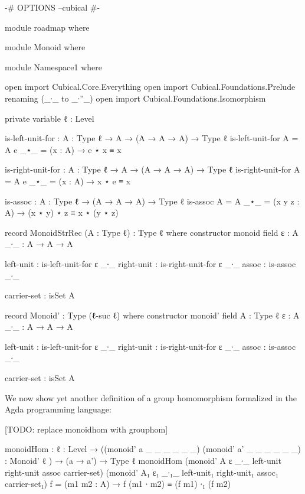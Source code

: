 \documentclass[11pt, a4paper]{article}
\begin{document}
\begin{code}[hide]
{-# OPTIONS --cubical #-}

module roadmap where

\end{code}

\begin{code}[hide]

module Monoid where

module Namespace1 where

  open import Cubical.Core.Everything
  open import Cubical.Foundations.Prelude renaming (_∙_ to _∙''_)
  open import Cubical.Foundations.Isomorphism

  private
    variable
      ℓ : Level

  is-left-unit-for : {A : Type ℓ} → A → (A → A → A) → Type ℓ
  is-left-unit-for {A = A} e _⋆_ = (x : A) → e ⋆ x ≡ x

  is-right-unit-for : {A : Type ℓ} → A → (A → A → A) → Type ℓ
  is-right-unit-for {A = A} e _⋆_ = (x : A) → x ⋆ e ≡ x

  is-assoc : {A : Type ℓ} → (A → A → A) → Type ℓ
  is-assoc {A = A} _⋆_ = (x y z : A) → (x ⋆ y) ⋆ z ≡ x ⋆ (y ⋆ z)

  record MonoidStrRec (A : Type ℓ) : Type ℓ where
    constructor
      monoid
    field
      ε   : A
      _∙_ : A → A → A

      left-unit  : is-left-unit-for ε _∙_
      right-unit : is-right-unit-for ε _∙_
      assoc      : is-assoc _∙_

      carrier-set : isSet A

  record Monoid' : Type (ℓ-suc ℓ) where
    constructor
      monoid'
    field
      A : Type ℓ
      ε   : A
      _∙_ : A → A → A

      left-unit  : is-left-unit-for ε _∙_
      right-unit : is-right-unit-for ε _∙_
      assoc      : is-assoc _∙_

      carrier-set : isSet A

\end{code}

We now show yet another definition of a group homomorphism formalized in the
Agda programming language:

[TODO: replace monoidhom with grouphom]

\begin{code}
  monoidHom : {ℓ : Level}
            → ((monoid' a _ _ _ _ _ _) (monoid' a' _ _ _ _ _ _) : Monoid' {ℓ} )
            → (a → a') → Type ℓ
  monoidHom
    (monoid' A ε _∙_ left-unit right-unit assoc carrier-set)
    (monoid' A₁ ε₁ _∙₁_ left-unit₁ right-unit₁ assoc₁ carrier-set₁)
    f
    = (m1 m2 : A) → f (m1 ∙ m2) ≡ (f m1) ∙₁ (f m2)
\end{code}
\end{document}
